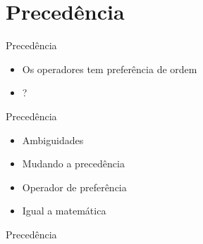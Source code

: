 \documentclass[11pt]{beamer}
\begin{document}
\section{Precedência}
	\begin{frame}{Precedência}
		\begin{itemize}
			\presentationPause\item Os operadores tem preferência de ordem
			\presentationPause\item {} ?
		\end{itemize}
		\presentationPause
		\presentationPause
	\end{frame}\begin{frame}{Precedência}
		\begin{itemize}
			\presentationPause\item Ambiguidades
			\presentationPause\item Mudando a precedência
			\presentationPause\item Operador de preferência
			\presentationPause\item Igual a matemática
		\end{itemize}
	\end{frame}\begin{frame}{Precedência}
		\begin{table}[!h]
			\tiny\centering
			\caption{Ordem de precedência de operadores}
		

\end{table}
\end{frame}
\end{document}
